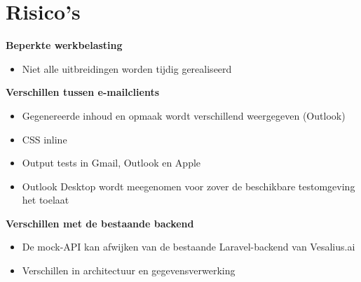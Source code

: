 \section{Risico's}%
\label{vst:risicos}

\textbf{Beperkte werkbelasting}
\begin{itemize}
    \item Niet alle uitbreidingen worden tijdig gerealiseerd
\end{itemize}

\textbf{Verschillen tussen e-mailclients}
\begin{itemize}
    \item Gegenereerde inhoud en opmaak wordt verschillend weergegeven (Outlook)
    \item CSS inline 
    \item Output tests in Gmail, Outlook en Apple
    \item Outlook Desktop wordt meegenomen voor zover de beschikbare testomgeving het toelaat
\end{itemize}

\textbf{Verschillen met de bestaande backend}
\begin{itemize}
    \item De mock-API kan afwijken van de bestaande Laravel-backend van Vesalius.ai
    \item Verschillen in architectuur en gegevensverwerking
\end{itemize}

